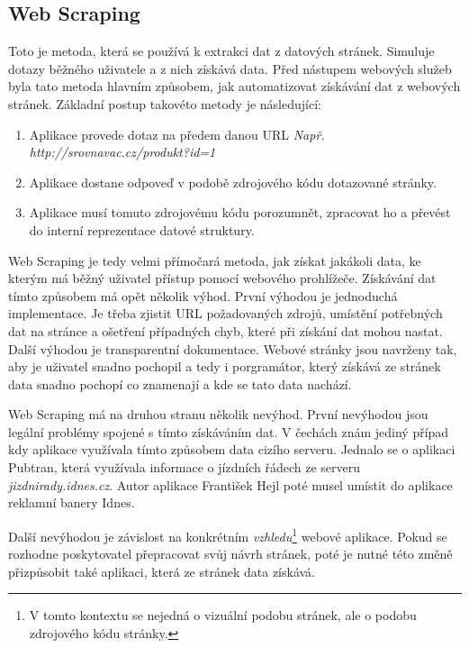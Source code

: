 \subsection{Web Scraping}
\label{sec:webscraping}
Toto je metoda, která se používá k extrakci dat z datových stránek. Simuluje dotazy běžného uživatele a z nich získává data. Před nástupem webových služeb byla tato metoda hlavním způsobem, jak automatizovat získávání dat z webových stránek\cite{oreilly2007web}. Základní postup takovéto metody je následující:

\begin{enumerate}
\item Aplikace provede dotaz na předem danou URL \newline \emph{Např. http://srovnavac.cz/produkt?id=1}
\item Aplikace dostane odpoveď v podobě zdrojového kódu dotazované stránky.
\item Aplikace musí tomuto zdrojovému kódu porozumnět, zpracovat ho a převést do interní reprezentace datové struktury.
\end{enumerate}

Web Scraping je tedy velmi přímočará metoda, jak získat jakákoli data, ke kterým má běžný uživatel přístup pomocí webového prohlížeče. Získávání dat tímto způsobem má opět několik výhod. První výhodou je jednoduchá implementace. Je třeba zjistit URL požadovaných zdrojů, umístění potřebných dat na stránce a ošetření případných chyb, které při získání dat mohou nastat. Další výhodou je transparentní dokumentace. Webové stránky jsou navrženy tak, aby je uživatel snadno pochopil a tedy i porgramátor, který získává ze stránek data snadno pochopí co znamenají a kde se tato data nachází.

Web Scraping má na druhou stranu několik nevýhod. První nevýhodou jsou legální problémy spojené s tímto získáváním dat. V čechách znám jediný případ kdy aplikace využívala tímto způsobem data cizího serveru. Jednalo se o aplikaci Pubtran, která využívala informace o jízdních řádech ze serveru \emph{jizdnirady.idnes.cz}. Autor aplikace František Hejl poté musel umístit do aplikace reklamní banery Idnes.

Další nevýhodou je závislost na konkrétním \emph{vzhledu}\footnote{V tomto kontextu se nejedná o vizuální podobu stránek, ale o podobu zdrojového kódu stránky.} webové aplikace. Pokud se rozhodne poskytovatel přepracovat svůj návrh stránek, poté je nutné této změně přizpůsobit také aplikaci, která ze stránek data získává.

